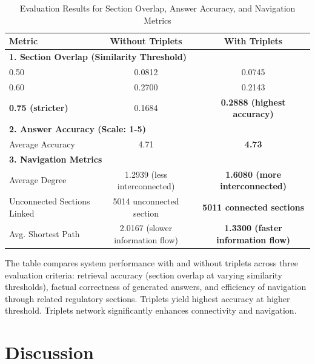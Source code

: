\documentclass{article}
\begin{document}
\begin{table}[htbp]
    \centering
    \caption{Evaluation Results for Section Overlap, Answer Accuracy, and Navigation Metrics}
    \label{tab:results}
    \begin{tabular}{|l|c|c|}
        \hline
        \textbf{Metric} & \textbf{Without Triplets} & \textbf{With Triplets} \\ 
        \hline
        \multicolumn{3}{|l|}{\textbf{1. Section Overlap (Similarity Threshold)}} \\ 
        \hline
        0.50 & 0.0812 & 0.0745 \\ 
        0.60 & 0.2700 & 0.2143 \\ 
        \textbf{0.75 (stricter)} & 0.1684 & \textbf{0.2888 (highest accuracy)} \\ 
        \hline
        \multicolumn{3}{|l|}{\textbf{2. Answer Accuracy (Scale: 1-5)}} \\ 
        \hline
        Average Accuracy & 4.71 & \textbf{4.73} \\ 
        \hline
        \multicolumn{3}{|l|}{\textbf{3. Navigation Metrics}} \\ 
        \hline
        Average Degree & 1.2939 (less interconnected) & \textbf{1.6080 (more interconnected)} \\ 
        Unconnected Sections Linked & 5014 unconnected section & \textbf{5011 connected sections} \\ 
        Avg. Shortest Path & 2.0167 (slower information flow) & \textbf{1.3300 (faster information flow)} \\ 
        \hline
    \end{tabular}
        \vspace{1ex}
    \begin{minipage}{0.95\textwidth}
        \small
        The table compares system performance with and without triplets across three evaluation criteria: retrieval accuracy (section overlap at varying similarity thresholds), factual correctness of generated answers, and efficiency of navigation through related regulatory sections. Triplets yield highest accuracy at higher threshold. Triplets network significantly enhances connectivity and navigation.
    \end{minipage}
    
\end{table}

\section{Discussion}
\end{document}
